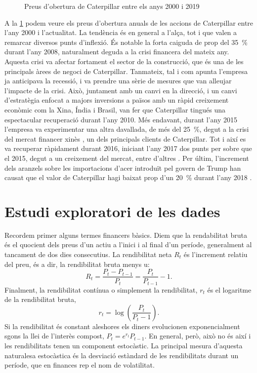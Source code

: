 \documentclass{article}
\numberwithin{table}{section}
\numberwithin{figure}{section}
\numberwithin{equation}{section}
\begin{document}
\begin{figure}[htb]
	\centering \sffamily \small
	
	\caption{Preus d'obertura de Caterpillar entre els anys 2000 i 2019}
	\label{fig:tancament}
\end{figure}

A la \cref{fig:tancament} podem veure els preus d'obertura anuals de les accions de Caterpillar entre l'any 2000 i l'actualitat. La tendència és en general a l'alça, tot i que valen a remarcar diversos punts d'inflexió. És notable la forta caiguda de prop del \SI{35}{\percent} durant l'any 2008, naturalment deguda a la crisi financera del mateix any. Aquesta crisi va afectar fortament el sector de la construcció, que és una de les principals àrees de negoci de Caterpillar. Tanmateix, tal i com apunta \cite{recupera} l'empresa ja anticipava la recessió, i va prendre una sèrie de mesures que van alleujar l'impacte de la crisi. Això, juntament amb un canvi en la direcció, i un canvi d'estratègia enfocat a majors inversions a països amb un ràpid creixement econòmic com la Xina, Índia i Brasil, van fer que Caterpillar tingués una espectacular recuperació durant l'any 2010. Més endavant, durant l'any 2015 l'empresa va experimentar una altra davallada, de més del \SI{25}{\percent}, degut a la crisi del mercat financer xinès \cite{xina}, un dels principals clients de Caterpillar. Tot i així es va recuperar ràpidament durant 2016, iniciant l'any 2017 dos punts per sobre que el 2015, degut a un creixement del mercat, entre d'altres \cite{crush}. Per últim, l'increment dels aranzels sobre les importacions d'acer introduït pel govern de Trump han causat que el valor de Caterpillar hagi baixat prop d'un \SI{20}{\percent} durant l'any 2018 \cite{trump}.

\section{Estudi exploratori de les dades}
Recordem primer alguns termes financers bàsics. Diem que la rendabilitat bruta és el quocient dels preus d'un actiu a l'inici i al final d'un període, generalment al tancament de dos dies consecutius. La rendibilitat neta \( R_t \) és l'increment relatiu del preu, és a dir, la rendibilitat bruta menys u:
\begin{equation*}
	R_t = \frac{P_t - P_{t-1}}{P_t} = \frac{P_t}{P_{t-1}} - 1.
\end{equation*}
Finalment, la rendibilitat contínua o simplement la rendibilitat, \( r_t \) és el logaritme de la rendibilitat bruta,
\begin{equation} \label{eq:rend}
	r_t = \log{\left(\frac{P_t}{P_t-1}\right)}.
\end{equation}
Si la rendibilitat és constant aleshores els diners evolucionen exponencialment sgons la llei de l'interès compost, \( P_t = e^{r_t}P_{t-1} \). En general, però, això no és així i les rendibilitats tenen un component estocàstic. La principal mesura d'aquesta naturalesa estocàstica és la desviació estàndard de les rendibilitats durant un període, que en finances rep el nom de volatilitat.
\end{document}
